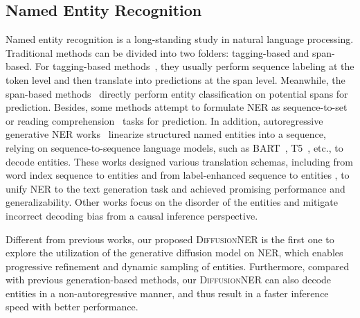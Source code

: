 \documentclass[11pt]{article}
\begin{document}
\subsection{Named Entity Recognition}
Named entity recognition is a long-standing study in natural language processing. Traditional methods can be divided into two folders: tagging-based and span-based. For tagging-based methods~\citep{10.1162/tacl_a_00104, ju-etal-2018-neural, wang-etal-2020-pyramid}, they usually perform sequence labeling at the token level and then translate into predictions at the span level. Meanwhile, the span-based methods~\citep{sohrab-miwa-2018-deep, Eberts, shen-etal-2021-locate, li2022unified} directly perform entity classification on potential spans for prediction. Besides, some methods attempt to formulate NER as sequence-to-set~\citep{ijcai2021-542, ijcai2022p613} or reading comprehension~\citep{li-etal-2020-unified, shen-etal-2022-parallel} tasks for prediction.
In addition, autoregressive generative NER works~\citep{athiwaratkun-etal-2020-augmented, decao2021autoregressive, yan-etal-2021-unified-generative, lu-etal-2022-unified} linearize structured named entities into a sequence, relying on sequence-to-sequence language models, such as BART~\citep{lewis-etal-2020-bart}, T5~\citep{2020t5}, etc., to decode entities. These works designed various translation schemas, including from word index sequence to entities \citep{yan-etal-2021-unified-generative} and from label-enhanced sequence to entities \citep{paolini2021structured}, to unify NER to the text generation task and achieved promising performance and generalizability. Other works \citep{zhang-etal-2022-de} focus on the disorder of the entities and mitigate incorrect decoding bias from a causal inference perspective.


Different from previous works, our proposed \textsc{DiffusionNER} is the first one to explore the utilization of the generative diffusion model on NER, which enables progressive refinement and dynamic sampling of entities. Furthermore, compared with previous generation-based methods, our \textsc{DiffusionNER} can also decode entities in a non-autoregressive manner, and thus result in a faster inference speed with better performance.
\end{document}
